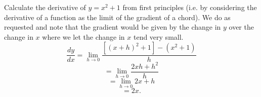 Calculate the derivative of $y = x^2 + 1$ from first principles (i.e. by considering the derivative of a function as the limit of the gradient of a chord).
\newline
We do as requested and note that the gradient would be given by the change in $y$ over the change in $x$ where we let the change in $x$ tend very small.
\[
\frac{dy}{dx} = \lim_{h \to 0} \frac{[(x+h)^2 + 1] - (x^2 + 1)}{h}
\]
\[
= \lim_{h \to 0} \frac{2xh+h^2}{h}
\]
\[
= \lim_{h \to 0} 2x + h
\]
\[
= 2x.
\]